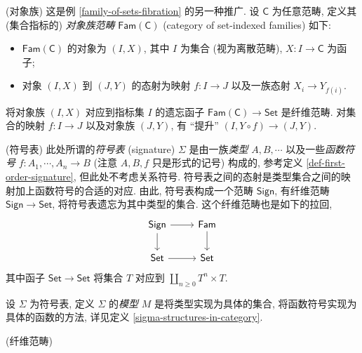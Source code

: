 \begin{example}
	{(对象族)}
	这是例 \ref{family-of-sets-fibration} 的另一种推广.
	设 $\mathsf C$ 为任意范畴, 定义其 (集合指标的) \emph{对象族范畴} $\mathsf {Fam}(\mathsf C)$ (category of set-indexed families) 如下:
	\begin{itemize}
		\item $\mathsf {Fam}(\mathsf C)$ 的对象为 $(I,X)$, 其中 $I$ 为集合 (视为离散范畴), $X\colon I\to \mathsf C$ 为函子;
		\item 对象 $(I,X)$ 到 $(J,Y)$ 的态射为映射 $f\colon I\to J$ 以及一族态射 $X_i \to Y_{f(i)}$.
	\end{itemize}
	将对象族 $(I,X)$ 对应到指标集 $I$ 的遗忘函子 $\mathsf {Fam}(\mathsf C)\to\mathsf {Set}$ 是纤维范畴.
	对集合的映射 $f\colon I\to J$ 以及对象族 $(J,Y)$,
	有 ``提升'' $(I,Y\circ f) \to (J,Y)$.
\end{example}

\begin{example}
	{(符号表)}
	此处所谓的\emph{符号表} (signature) $\Sigma$ 是由一族\emph{类型} $A,B,\cdots$ 以及一些\emph{函数符号} $f\colon A_1,\cdots,A_n\to B$ (注意 $A,B,f$ 只是形式的记号) 构成的, 参考定义 \ref{def-first-order-signature}, 但此处不考虑关系符号. 符号表之间的态射是类型集合之间的映射加上函数符号的合适的对应. 由此, 符号表构成一个范畴 $\mathsf {Sign}$, 有纤维范畴 $\mathsf {Sign}\to\mathsf {Set}$, 将符号表遗忘为其中类型的集合.
	这个纤维范畴也是如下的拉回,
	\[\begin{tikzcd}[ampersand replacement=\&]
		{\mathsf {Sign}} \& {\mathsf {Fam}} \\
		{\mathsf {Set}} \& {\mathsf {Set}}
		\arrow[from=1-1, to=2-1]
		\arrow[from=2-1, to=2-2]
		\arrow[from=1-1, to=1-2]
		\arrow[from=1-2, to=2-2]
	\end{tikzcd}\]
	其中函子 $\mathsf {Set}\to\mathsf {Set}$ 将集合 $T$ 对应到 $\coprod_{n\geq 0}T^n\times T$.
	
	设 $\Sigma$ 为符号表, 定义 $\Sigma$ 的\emph{模型} $M$ 是将类型实现为具体的集合, 将函数符号实现为具体的函数的方法, 详见定义 \ref{sigma-structures-in-category}.
\end{example}

\begin{definition}
	{(纤维范畴)}
	
\end{definition}